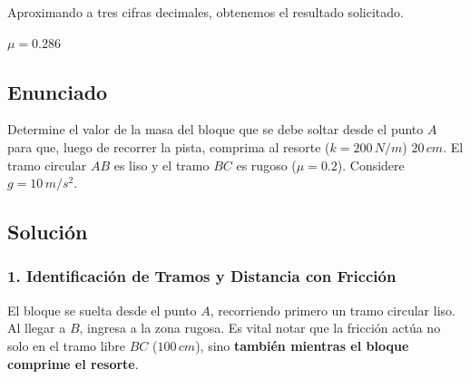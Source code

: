 \documentclass[12pt, a4paper]{article}
\begin{document}
Aproximando a tres cifras decimales, obtenemos el resultado solicitado.

\begin{tcolorbox}[colback=green!5!white, colframe=green!50!black, title=Respuesta Final]
\centering \Large $\mu = 0.286$
\end{tcolorbox}

\newpage

\subsection*{Enunciado}
Determine el valor de la masa del bloque que se debe soltar desde el punto $A$ para que, luego de recorrer la pista, comprima al resorte ($k = 200 \, \si{N/m}$) $20 \, \si{cm}$. El tramo circular $AB$ es liso y el tramo $BC$ es rugoso ($\mu = 0.2$). Considere $g = 10 \, \si{m/s^2}$.

\begin{center}
\end{center}

\subsection*{Solución}

\subsubsection*{1. Identificación de Tramos y Distancia con Fricción}
El bloque se suelta desde el punto $A$, recorriendo primero un tramo circular liso. Al llegar a $B$, ingresa a la zona rugosa. Es vital notar que la fricción actúa no solo en el tramo libre $BC$ ($100 \, \si{cm}$), sino \textbf{también mientras el bloque comprime el resorte}.
\end{document}
